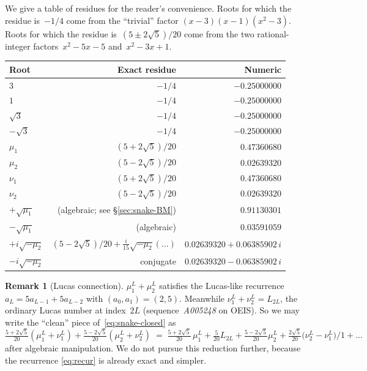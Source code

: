 \documentclass[11pt,a4paper]{article}
\theoremstyle{definition}
\newtheorem{remark}[definition]{Remark}
\theoremstyle{plain}
\begin{document}
We give a table of residues for the reader's convenience.  Roots for which
the residue is~$-1/4$ come from the ``trivial'' factor
$(x-3)(x-1)(x^2-3)$.  Roots for which the residue is~$(5\pm 2\sqrt{5})/20$
come from the two rational-integer factors~$x^2 - 5x - 5$ and~$x^2 - 3x + 1$.

\begin{center}
\renewcommand{\arraystretch}{1.15}
\begin{tabular}{@{}l r r@{}}
\toprule
Root & Exact residue & Numeric \\
\midrule
$3$ & $-1/4$ & $-0.25000000$ \\
$1$ & $-1/4$ & $-0.25000000$ \\
$\sqrt{3}$  & $-1/4$ & $-0.25000000$ \\
$-\sqrt{3}$ & $-1/4$ & $-0.25000000$ \\
$\mu_1$ & $(5+2\sqrt{5})/20$ & $\phantom{-}0.47360680$ \\
$\mu_2$ & $(5-2\sqrt{5})/20$ & $\phantom{-}0.02639320$ \\
$\nu_1$ & $(5+2\sqrt{5})/20$ & $\phantom{-}0.47360680$ \\
$\nu_2$ & $(5-2\sqrt{5})/20$ & $\phantom{-}0.02639320$ \\
$+\sqrt{\mu_1}$ & (algebraic; see \S\ref{sec:snake-BM}) & $\phantom{-}0.91130301$ \\
$-\sqrt{\mu_1}$ & (algebraic) & $\phantom{-}0.03591059$ \\
$+i\sqrt{-\mu_2}$ & $(5-2\sqrt{5})/20 + \tfrac{i}{15}\sqrt{-\mu_2}(\dots)$ & $0.02639320 + 0.06385902\,i$ \\
$-i\sqrt{-\mu_2}$ & conjugate & $0.02639320 - 0.06385902\,i$ \\
\bottomrule
\end{tabular}
\end{center}

\begin{remark}[Lucas connection]
$\mu_1^L + \mu_2^L$ satisfies the Lucas-like recurrence
$a_L = 5 a_{L-1} + 5 a_{L-2}$ with $(a_0, a_1) = (2, 5)$.  Meanwhile
$\nu_1^L + \nu_2^L = L_{2L}$, the ordinary Lucas number at index~$2L$
(sequence~\emph{A005248} on OEIS).  So we may write the ``clean''
piece of~\eqref{eq:snake-closed} as
\[
\tfrac{5+2\sqrt5}{20}(\mu_1^L + \nu_1^L) + \tfrac{5-2\sqrt5}{20}(\mu_2^L + \nu_2^L)
\;=\; \tfrac{5+2\sqrt5}{20}\,\mu_1^L + \tfrac{5}{20} L_{2L}
    + \tfrac{5-2\sqrt5}{20}\mu_2^L + \tfrac{2\sqrt5}{20}\!\bigl(\nu_2^L - \nu_1^L\bigr)/1 + \dots
\]
after algebraic manipulation.  We do not pursue this reduction further,
because the recurrence \eqref{eq:recur} is already exact and simpler.
\end{remark}
\end{document}
